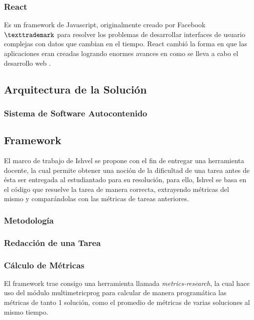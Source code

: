 \documentclass[letterpaper,12pt]{article}
\begin{document}
\subsubsection{React}

Es un framework de Javascript, originalmente creado por Facebook$\texttrademark$ para resolver los problemas de desarrollar interfaces de usuario complejas con datos que cambian en el tiempo. React cambió la forma en que las aplicaciones eran creadas logrando enormes avances en como se lleva a cabo el desarrollo web \cite{Gackenheimer2015}.

\subsection{Arquitectura de la Solución}

\subsubsection{Sistema de Software Autocontenido}

\subsection{Framework}

El marco de trabajo de Ishvel se propone con el fin de entregar una herramienta docente, la cual permite obtener una noción de la dificultad de una tarea antes de ésta ser entregada al estudiantado para su resolución, para ello, Ishvel se basa en el código que resuelve la tarea de manera correcta, extrayendo métricas del mismo y comparándolas con las métricas de tareas anteriores.

\subsubsection{Metodología}

\subsubsection{Redacción de una Tarea}
\subsubsection{Cálculo de Métricas} \label{sssec:metricsCalc}

El framework trae consigo una herramienta llamada \textit{metrics-research}, la cual hace uso del módulo multimetricprog \cite{privkweihmann_multimetricprog} para calcular de manera programática las métricas de tanto 1 solución, como el promedio de métricas de varias soluciones al mismo tiempo.
\end{document}
